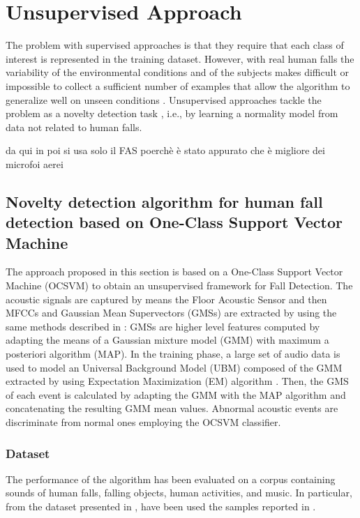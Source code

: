 \chapter{Unsupervised Approach}


The problem with supervised approaches is that they require that each class of interest is represented in the training dataset. However, with real human falls the variability of the environmental conditions and of the subjects makes difficult or impossible to collect a sufficient number of examples that allow the algorithm to generalize well on unseen conditions \cite{Noury2007}. Unsupervised approaches tackle the problem as a novelty detection task \cite{markou2003novelty1,markou2003novelty2}, i.e., by learning a normality model from data not related to human falls.


da qui in poi si usa solo il FAS poerchè è stato appurato che è migliore dei microfoi aerei

\section{Novelty detection algorithm for human fall detection based on One-Class Support Vector Machine}
\label{sec:ocsvm_approach}

The approach proposed in this section is based on a One-Class Support Vector Machine (OCSVM) \cite{scholkopf2000} to obtain an unsupervised framework for Fall Detection.
The acoustic signals are captured by means the Floor Acoustic Sensor and then MFCCs and Gaussian Mean Supervectors (GMSs) are extracted by using the same methods described in : GMSs are higher level features computed by adapting the means of a Gaussian mixture model (GMM) with maximum a posteriori algorithm (MAP).
In the training phase, a large set of audio data is used to model an Universal Background Model (UBM) composed of the GMM extracted by using Expectation Maximization (EM) algorithm \cite{bilmes1998gentle}.
Then, the GMS of each event is calculated by adapting the GMM with the MAP algorithm and concatenating the resulting GMM mean values.
Abnormal acoustic events are discriminate from normal ones employing the OCSVM classifier.


\subsection{Dataset}
The performance of the algorithm has been evaluated on a corpus containing sounds of human falls, falling objects, human activities, and music. In particular, from the dataset presented in , have been used the samples reported in .

